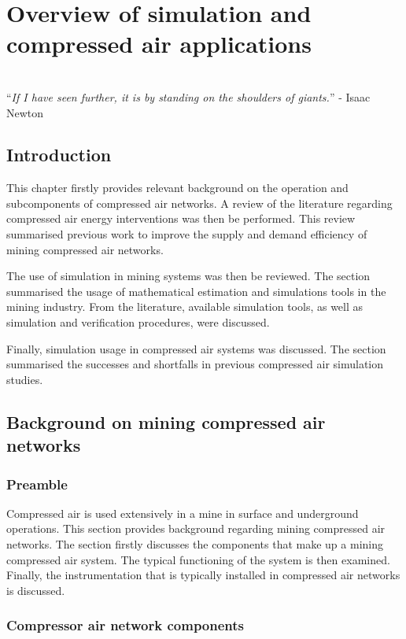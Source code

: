 \chapter{Overview of simulation and compressed air applications}
\label{Chap2}
\thispagestyle{empty}
\vspace{40em}
\hrulefill
\\
\enquote{\textit{If I have seen further, it is by standing on the shoulders of giants.}} - Isaac Newton\\
\clearpage
\section{Introduction}
 This chapter firstly provides relevant background on the operation and subcomponents of compressed air networks. A review of the literature regarding compressed air energy interventions was then be performed. This review summarised previous work to improve the supply and demand efficiency of mining compressed air networks.
\par
The use of simulation in mining systems was then be reviewed. The section summarised the usage of mathematical estimation and simulations tools in the mining industry.  From the literature, available simulation tools, as well as simulation and verification procedures, were discussed.
\par
Finally, simulation usage in compressed air systems was discussed. The section summarised the successes and shortfalls in previous compressed air simulation studies.
\section{Background on mining compressed air networks}
\subsection{Preamble}
Compressed air is used extensively in a mine in surface and underground operations. This section provides background regarding mining compressed air networks. The section firstly discusses the components that make up a mining compressed air system. The typical functioning of the system is then examined. Finally, the instrumentation that is typically installed in compressed air networks is discussed.
\subsection{Compressor air network components}
